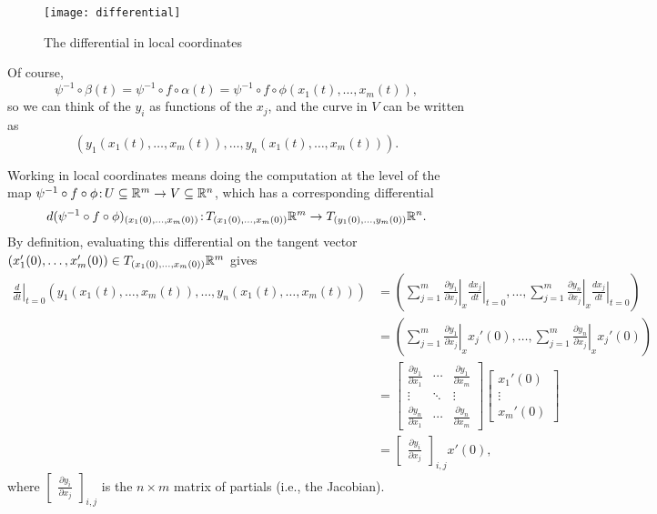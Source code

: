 \begin{figure}[htbp]
	\centering
		\texttt{[image: differential]}
	\caption{The differential in local coordinates}
	\label{fig:differential}
\end{figure}

Of course,
\[
	\psi^{-1} \circ \beta(t) = \psi^{-1} \circ f \circ \alpha(t) = \psi^{-1} \circ f \circ \phi(x_1(t), \dots , x_m(t)),
\]
so we can think of the $y_i$ as functions of the $x_j$, and the curve in $V$ can be written as
\[
	(y_1(x_1(t),\dots , x_m(t)), \dots , y_n(x_1(t), \dots , x_m(t))).
\]

Working in local coordinates means doing the computation at the level of the map $\psi^{-1} \circ f \circ \phi \colon\thinspace\!\! U \subseteq \mathbb{R}^m \to V \subseteq \mathbb{R}^n$, which has a corresponding differential
\[
	d(\psi^{-1} \circ f \circ \phi)_{(x_1(0),\dots , x_m(0))} \colon\thinspace\!\! T_{(x_1(0),\dots , x_m(0))} \mathbb{R}^m \to T_{(y_1(0), \dots , y_m(0))} \mathbb{R}^n.
\]
By definition, evaluating this differential on the tangent vector $(x_1'(0), \dots , x_m'(0)) \in T_{(x_1(0),\dots , x_m(0))}\mathbb{R}^m$ gives
\begin{align*}
	\left. \frac{d}{dt} \right|_{t=0} (y_1(x_1(t),\dots , x_m(t)), \dots , y_n(x_1(t),\dots , x_m(t))) & = \left( \sum_{j=1}^m \left.\frac{\partial y_1}{\partial x_j}\right|_{x} \left.\frac{d x_j}{dt} \right|_{t=0}, \dots , \sum_{j=1}^m \left.\frac{\partial y_n}{\partial x_j} \right|_x \left. \frac{d x_j}{dt} \right|_{t=0} \right) \\
	& = \left( \sum_{j=1}^m \left.\frac{\partial y_1}{\partial x_j}\right|_{x} x_j'(0), \dots , \sum_{j=1}^m \left.\frac{\partial y_n}{\partial x_j} \right|_x x_j'(0) \right) \\
	& = \begin{bmatrix} \frac{\partial y_1}{\partial x_1} & \cdots & \frac{\partial y_1}{\partial x_m} \\ \vdots & \ddots & \vdots \\ \frac{\partial y_n}{\partial x_1} & \cdots & \frac{\partial y_n}{\partial x_m} \end{bmatrix} \begin{bmatrix} x_1'(0) \\ \vdots \\ x_m'(0) \end{bmatrix} \\
	& = \begin{bmatrix} \frac{\partial y_i}{\partial x_j} \end{bmatrix}_{i,j} x'(0),
\end{align*}
where $\begin{bmatrix} \frac{\partial y_i}{\partial x_j} \end{bmatrix}_{i,j} $ is the $n \times m$ matrix of partials (i.e., the Jacobian).

